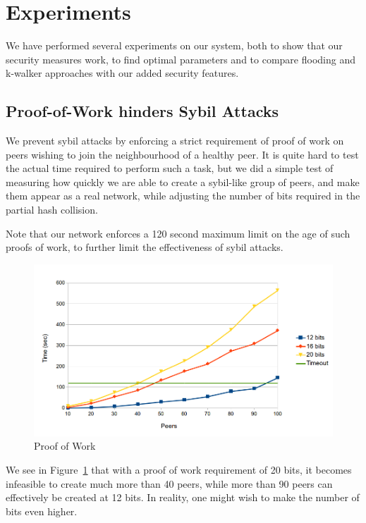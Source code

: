 \section{Experiments}
We have performed several experiments on our system, both to show that our security measures work, to find optimal parameters and to compare flooding and k-walker approaches with our added security features.

\subsection{Proof-of-Work hinders Sybil Attacks}
We prevent sybil attacks by enforcing a strict requirement of proof of work on peers wishing to join the neighbourhood of a healthy peer. It is quite hard to test the actual time required to perform such a task, but we did a simple test of measuring how quickly we are able to create a sybil-like group of peers, and make them appear as a real network, while adjusting the number of bits required in the partial hash collision.

Note that our network enforces a 120 second maximum limit on the age of such proofs of work, to further limit the effectiveness of sybil attacks.

\begin{figure}
\caption{Proof of Work}
\label{graphs_pow}
\includegraphics[width=\textwidth]{../Grapes/proof_of_work_graph.png}
\end{figure}

We see in Figure~\ref{graphs_pow} that with a proof of work requirement of 20 bits, it becomes infeasible to create much more than 40 peers, while more than 90 peers can effectively be created at 12 bits. In reality, one might wish to make the number of bits even higher.

